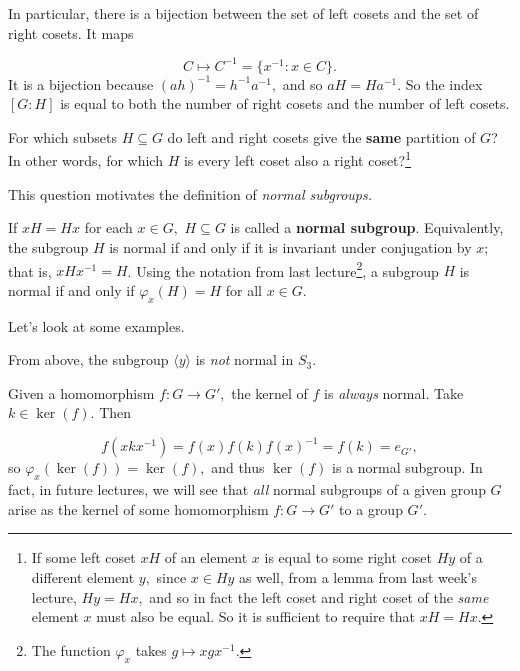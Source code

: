 In particular, there is a bijection between the set of left cosets and the set of right cosets. It maps

\[
C \mapsto C^{-1} = \{x^{-1} : x \in C\}.
\]
It is a bijection because $(ah)^{-1} = h^{-1}a^{-1},$ and so $aH = Ha^{-1}$. So the index $[G:H]$ is equal to both the number of right cosets and the number of left cosets. 

\begin{qq}
For which subsets $H \subseteq G$ do left and right cosets give the \textbf{same} partition of $G$? In other words, for which $H$ is every left coset also a right coset?\footnote{If some left coset $xH$ of an element $x$ is equal to some right coset $Hy$ of a different element $y,$ since $x \in Hy$ as well, from a lemma from last week's lecture, $Hy = Hx,$ and so in fact the left coset and right coset of the \emph{same} element $x$ must also be equal. So it is sufficient to require that $xH = Hx.$}

\end{qq}

This question motivates the definition of \emph{normal subgroups.}
\begin{definition}
If $xH = Hx$ for each $x \in G,$ $H \subseteq G$ is called a \textbf{normal subgroup}.
Equivalently, the subgroup $H$ is normal if and only if it is invariant under conjugation by $x$; that is, $xHx^{-1} = H$. Using the notation from last lecture\footnote{The function $\varphi_x$ takes $g \mapsto xgx^{-1}.$}, a subgroup $H$ is normal if and only if $\varphi_x(H) = H$ for all $x \in G.$ 
\end{definition}

Let's look at some examples.
\begin{example}
From above, the subgroup $\langle y \rangle$ is \emph{not} normal in $S_3.$ 

\end{example}

\begin{example}[Kernel]
Given a homomorphism $f: G \rightarrow G',$ the kernel of $f$ is \emph{always} normal. Take $k \in \ker(f).$ Then 

\[
f(xkx^{-1}) = f(x)f(k)f(x)^{-1} = f(k) = e_{G'},
\]
so $\varphi_x(\ker(f)) = \ker(f),$ and thus $\ker(f)$ is a normal subgroup. In fact, in future lectures, we will see that \emph{all} normal subgroups of a given group $G$ arise as the kernel of some homomorphism $f: G \rightarrow G'$ to a group $G'.$
\end{example}

